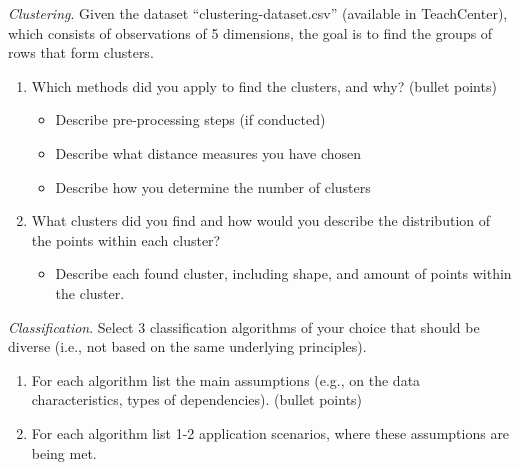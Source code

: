\documentclass[a4paper,10pt]{article}\setlength{\textheight}{10in}\setlength{\textwidth}{6.5in}\setlength{\topmargin}{-0.125in}\setlength{\oddsidemargin}{-.2in}\setlength{\evensidemargin}{-.2in}\setlength{\headsep}{0.2in}\setlength{\footskip}{0pt}\usepackage{amsmath}\usepackage{fancyhdr}\usepackage{enumitem}\usepackage{hyperref}\usepackage{xcolor}\usepackage{graphicx}\pagestyle{fancy}
\begin{document}
\begin{enumerate}[topsep=0mm, partopsep=0mm, leftmargin=*]
{\color{blue}
\newpage\item \textit{Clustering}. Given the dataset ``clustering-dataset.csv'' (available in TeachCenter), which consists of observations of 5 dimensions, the goal is to find the groups of rows that form clusters.
\begin{enumerate}
	\item Which methods did you apply to find the clusters, and why? (bullet points)
	\begin{itemize}
		\item Describe pre-processing steps (if conducted)
		\item Describe what distance measures you have chosen
		\item Describe how you determine the number of clusters
	\end{itemize}
	\item What clusters did you find and how would you describe the distribution of the points within each cluster?
	\begin{itemize}
		\item Describe each found cluster, including shape, and amount of points within the cluster.
	\end{itemize}
\end{enumerate}
}




{\color{blue}
\newpage\item\textit{Classification}. Select 3 classification algorithms of your choice that should be diverse (i.e., not based on the same underlying principles).
\begin{enumerate}
	\item For each algorithm list the main assumptions (e.g., on the data characteristics, types of dependencies). (bullet points) 
	\item For each algorithm list 1-2 application scenarios, where these assumptions are being met.
\end{enumerate}
}



\end{enumerate}
\end{document}
